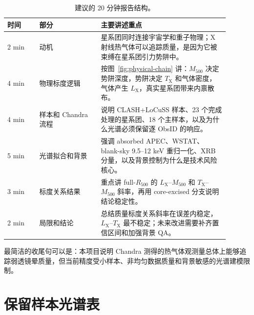 \documentclass[UTF8,11pt,fontset=none]{ctexart}
\newcommand{\Mfive}{\ensuremath{M_{500}}}
\newcommand{\Rfive}{\ensuremath{R_{500}}}
\newcommand{\Lx}{\ensuremath{L_{\mathrm{X}}}}
\newcommand{\Tx}{\ensuremath{T_{\mathrm{X}}}}
\begin{document}
\begin{table}[ht]
\centering
\caption{建议的 20 分钟报告结构。}
\begin{tabular}{p{0.13\linewidth}p{0.25\linewidth}p{0.52\linewidth}}
\toprule
时间 & 部分 & 主要讲述重点 \\
\midrule
2 min & 动机 & 星系团同时连接宇宙学和重子物理；X 射线热气体可以追踪质量，是因为它被束缚在星系团引力势阱中。 \\
4 min & 物理标度逻辑 & 按图~\ref{fig:physical-chain} 讲：\Mfive{} 决定势阱深度，势阱决定 \Tx{} 和气体密度，气体产生 \Lx{}，真实星系团带来内禀散布。 \\
4 min & 样本和 Chandra 流程 & 说明 CLASH+LoCuSS 样本、23 个完成处理的星系团、18 个主样本，以及为什么光谱必须保留逐 ObsID 的响应。 \\
5 min & 光谱拟合和背景 & 强调 absorbed APEC、WSTAT、blank-sky 9.5--12 keV 重归一化、XRB 分量，以及背景控制为什么是技术风险核心。 \\
3 min & 标度关系结果 & 重点讲 full-\Rfive{} 的 \Lx--\Mfive{} 和 \Tx--\Mfive{} 斜率，再用 core-excised 分支说明结论稳定性。 \\
2 min & 局限和结论 & 总结质量标度关系斜率在误差内稳定，\Lx--\Tx{} 最不稳定；未来改进需要补齐置信区间和加强背景 QA。 \\
\bottomrule
\end{tabular}
\end{table}

最简洁的收尾句可以是：本项目说明 Chandra 测得的热气体观测量总体上能够追踪弱透镜晕质量，但当前精度受小样本、非均匀数据质量和背景敏感的光谱建模限制。

\section{保留样本光谱表}
\end{document}
